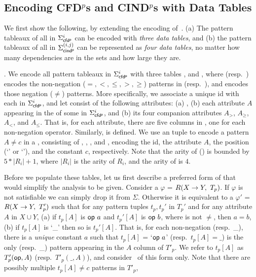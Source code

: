 \subsection{Encoding CFD$^p$s and CIND$^p$s with Data Tables}

We first show the following, by extending the encoding
of~\cite{CFDs,icde08}.
(a) The pattern tableaux
of all \pCFDs in $\Sigma_{{\mathsf{cfd^p}}}^i$ can be encoded with {\em three data tables},
and
(b) the pattern tableaux of all \pCINDs in $\Sigma_{{\mathsf{cind^p}}}^{(i,j)}$ can be
represented as
{\em four data tables}, no matter how many dependencies are
in the sets and how large they are.


. We encode all  pattern tableaux
in $\Sigma_{{\mathsf{cfd^p}}}^i$ with three tables ,  and \Enc{\ne}, where
 (resp.~) encodes the non-negation ($=,<,
\le, >, \ge$) patterns in \LHS (resp.~\RHS),
and
\Enc{\ne} encodes those negation ($\ne$) patterns.
More specifically, we associate a unique id  with each
\pCFDs in $\Sigma_{{\mathsf{cfd^p}}}^i$, and let
 consist of the following
attributes: (a) , (b)
each attribute $A$ appearing in the \LHS of some \pCFDs in $\Sigma_{{\mathsf{cfd^p}}}^i$, and
 (b) its four companion attributes $A_{>}$, $A_{\ge}$, $A_{<}$, and
 $A_{\le}$. That is, for each attribute, there are five columns in
 , one for each non-negation operator.
Similarly,  is defined. We use an \Enc{\ne} tuple to encode a
pattern $A \ne c$ in a \pCFD, consisting of , ,
, and , encoding the \pCFD id, the attribute $A$,
the position (`\LHS' or `\RHS'), and the constant $c$, respectively.
Note that the arity of  () is bounded by $5*|R_i|+1$,
where $|R_i|$ is the arity of $R_i$, and the arity of \Enc{\ne} is
$4$.

Before we populate these tables, let us first describe a preferred
form of \pCFDs that would simplify the analysis to be given.
Consider a \pCFD $\varphi$ = $R(X\rightarrow Y,\ T_p)$. If $\varphi$ is not
satisfiable we can simply drop it from $\Sigma$. Otherwise it is
equivalent to a \pCFD $\varphi'$ = $R(X\rightarrow Y,\ T_p')$ such that for
any pattern tuples $t_p, t_p'$ in $T_p'$ and for any attribute $A$
in $X\cup Y$, (a) if $t_p[A]$ is $\op a$ and $t_p'[A]$ is $\op b$,
where \op is not $\ne$, then $a=b$, (b) if $t_p[A]$ is `\_' then so
is $t_p'[A]$. That is, for each non-negation \op (resp.~\_), there
is a {\em unique} constant $a$ such that $t_p[A]$ = `$\op a$'
(resp.~$t_p[A]=\_$) is the only \op (resp.~\_) pattern appearing in
the $A$ column of $T'_p$. We refer to $t_p[A]$ as $T'_p({\mathsf{op}},A)$
(resp.~$T'_p(\_,A)$), and consider \kwlog~\pCFDs of this form only.
Note that there are possibly multiple $t_p[A] \ne c$ patterns in
$T'_p$,

